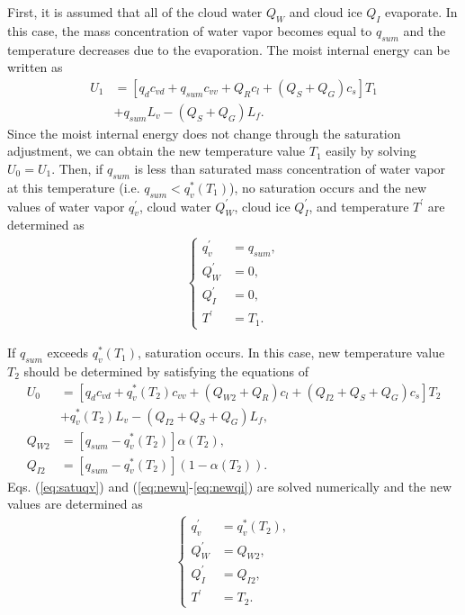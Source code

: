 First, it is assumed that all of the cloud water $Q_{W}$ and cloud ice $Q_{I}$ evaporate.
In this case, the mass concentration of water vapor becomes equal to $q_{sum}$ and the temperature decreases due to the evaporation.
The moist internal energy can be written as
\begin{align}
  U_{1}&=[q_{d}c_{vd}+q_{sum}c_{vv}+Q_{R}c_{l}+(Q_{S}+Q_{G})c_{s}]T_{1} \nonumber \\ 
  &+q_{sum}L_{v}-(Q_{S}+Q_{G})L_{f}.
\end{align}
Since the moist internal energy does not change through the saturation adjustment, we can obtain the new temperature value $T_{1}$ easily by solving $U_{0}=U_{1}$. Then, if $q_{sum}$ is less than saturated mass concentration of water vapor at this temperature (i.e. $q_{sum}<q^{*}_{v} (T_{1})$), no saturation occurs and the new values of water vapor $q^{\prime}_{v}$, cloud water $Q^{\prime}_{W}$, cloud ice $Q^{\prime}_{I}$, and temperature $T^{\prime}$ are determined as
\begin{align}
\begin{cases}
  q^{\prime}_{v} &= q_{sum}, \\
  Q^{\prime}_{W} &= 0, \\
  Q^{\prime}_{I} &= 0, \\
  T^{\prime} &= T_{1}.
\end{cases}
\end{align}

If $q_{sum}$ exceeds $q^{*}_{v} (T_{1})$, saturation occurs. In this case, new temperature value $T_{2}$ should be determined by satisfying the equations of
\begin{align}
  U_{0}&=[q_{d}c_{vd}+q^{*}_{v}(T_{2})c_{vv}+(Q_{W2}+Q_{R})c_{l}+(Q_{I2}+Q_{S}+Q_{G})c_{s}]T_{2} \nonumber \\ 
  &+q^{*}_{v}(T_{2})L_{v}-(Q_{I2}+Q_{S}+Q_{G})L_{f}\label{eq:newu}, \\
  Q_{W2}&=[q_{sum}-q^{*}_{v}(T_{2})]\alpha (T_{2})\label{eq:newqw}, \\
  Q_{I2}&=[q_{sum}-q^{*}_{v}(T_{2})](1-\alpha (T_{2}))\label{eq:newqi}.
\end{align}
Eqs. (\ref{eq:satuqv}) and (\ref{eq:newu}-\ref{eq:newqi}) are solved numerically and the new values are determined as
\begin{align}
\begin{cases}
  q^{\prime}_{v} &= q^{*}_{v}(T_{2}), \\
  Q^{\prime}_{W} &= Q_{W2}, \\
  Q^{\prime}_{I} &= Q_{I2}, \\
  T^{\prime} &= T_{2}.
\end{cases}
\end{align}

